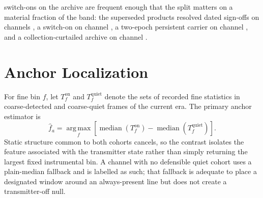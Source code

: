 switch-ons on the archive are frequent enough that the split matters on a
material fraction of the band: the superseded products resolved dated sign-offs
on channels , a switch-on on channel ,
a two-epoch persistent carrier on channel , and a collection-curtailed
archive on channel .


\section{Anchor Localization}
\label{sec:calibration:anchors}

For fine bin $f$, let $T_f^{\mathrm{on}}$ and $T_f^{\mathrm{quiet}}$ denote the
sets of recorded fine statistics in coarse-detected and coarse-quiet frames of
the current era.  The primary anchor estimator is
\begin{equation}
  \widehat f_a
  = \operatorname*{arg\,max}_{f}
  \left[
    \operatorname{median}(T_f^{\mathrm{on}})
    - \operatorname{median}(T_f^{\mathrm{quiet}})
  \right].
  \label{eq:calibration:anchor}
\end{equation}
Static structure common to both cohorts cancels, so the contrast isolates the
feature associated with the transmitter state rather than simply returning the
largest fixed instrumental bin.  A channel with no defensible quiet cohort uses
a plain-median fallback and is labelled as such; that fallback is adequate to
place a designated window around an always-present line but does not create a
transmitter-off null.

